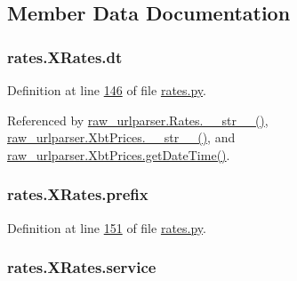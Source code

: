 \subsection{Member Data Documentation}
\subsubsection[{\texorpdfstring{dt}{dt}}]{\setlength{\rightskip}{0pt plus 5cm}rates.\+X\+Rates.\+dt}\hypertarget{classrates_1_1_x_rates_aa7835a0ac1d41af607d6d5885b49c131}{}\label{classrates_1_1_x_rates_aa7835a0ac1d41af607d6d5885b49c131}


Definition at line \hyperlink{rates_8py_source_l00146}{146} of file \hyperlink{rates_8py_source}{rates.\+py}.



Referenced by \hyperlink{raw__urlparser_8py_source_l00038}{raw\+\_\+urlparser.\+Rates.\+\_\+\+\_\+str\+\_\+\+\_\+()}, \hyperlink{raw__urlparser_8py_source_l00074}{raw\+\_\+urlparser.\+Xbt\+Prices.\+\_\+\+\_\+str\+\_\+\+\_\+()}, and \hyperlink{raw__urlparser_8py_source_l00059}{raw\+\_\+urlparser.\+Xbt\+Prices.\+get\+Date\+Time()}.

\subsubsection[{\texorpdfstring{prefix}{prefix}}]{\setlength{\rightskip}{0pt plus 5cm}rates.\+X\+Rates.\+prefix}\hypertarget{classrates_1_1_x_rates_a3b92b41b0fbd77b44d01f094ff83dd9d}{}\label{classrates_1_1_x_rates_a3b92b41b0fbd77b44d01f094ff83dd9d}


Definition at line \hyperlink{rates_8py_source_l00151}{151} of file \hyperlink{rates_8py_source}{rates.\+py}.

\subsubsection[{\texorpdfstring{service}{service}}]{\setlength{\rightskip}{0pt plus 5cm}rates.\+X\+Rates.\+service}\hypertarget{classrates_1_1_x_rates_ad80e3c0295deaa15fac085324716747f}{}\label{classrates_1_1_x_rates_ad80e3c0295deaa15fac085324716747f}


